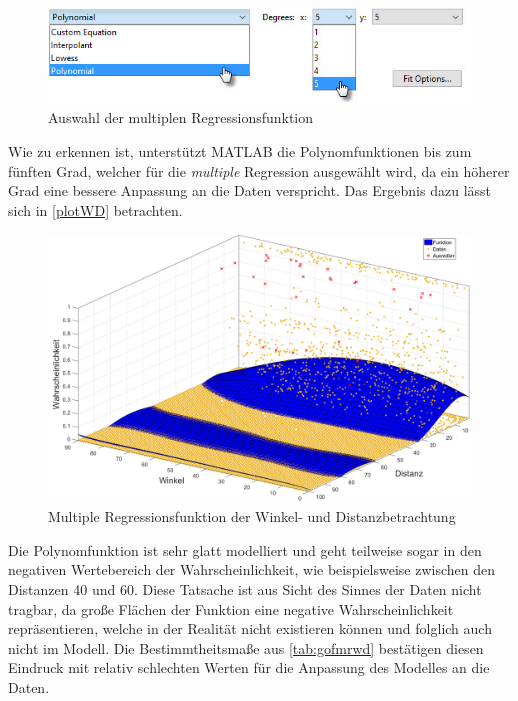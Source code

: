 \begin{figure}[H]
\centering
\includegraphics[scale=0.8]{se-wa-jpg/polyWD}
\caption{Auswahl der multiplen Regressionsfunktion}
\label{polyWD}
\end{figure}

Wie zu erkennen ist, unterstützt MATLAB die Polynomfunktionen bis zum fünften Grad, welcher für die \textit{multiple} Regression ausgewählt wird, da ein höherer Grad eine bessere Anpassung an die Daten verspricht. Das Ergebnis dazu lässt sich in \vref{plotWD} betrachten.

\begin{figure}[H]
\centering
\includegraphics[scale=0.34]{se-wa-jpg/plotWD}
\caption{Multiple Regressionsfunktion der Winkel- und Distanzbetrachtung}
\label{plotWD}
\end{figure}

Die Polynomfunktion ist sehr glatt modelliert und geht teilweise sogar in den negativen Wertebereich der Wahrscheinlichkeit, wie beispielsweise zwischen den Distanzen \textsf{40} und \textsf{60}. Diese Tatsache ist aus Sicht des Sinnes der Daten nicht tragbar, da große Flächen der Funktion eine negative Wahrscheinlichkeit repräsentieren, welche in der Realität nicht existieren können und folglich auch nicht im Modell. Die Bestimmtheitsmaße aus \vref{tab:gofmrwd} bestätigen diesen Eindruck mit relativ schlechten Werten für die Anpassung des Modelles an die Daten.


